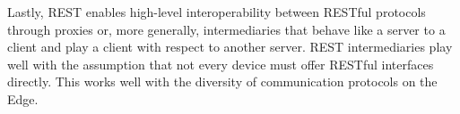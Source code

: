 Lastly, REST enables high-level interoperability between RESTful protocols through proxies or, more generally, intermediaries that behave like a server to a client and play a client with respect to another server. REST intermediaries play well with the assumption that not every device must offer RESTful interfaces directly. This works well with the diversity of communication protocols on the Edge.



